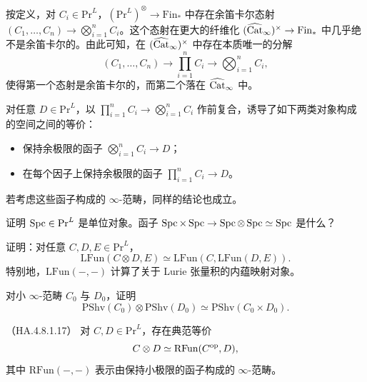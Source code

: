 \nitem\label{L25-3.2} 按定义，对 $C_{i}\in\mathrm{Pr}^{L}$，$(\mathrm{Pr}^{L})^{\otimes}\to\mathrm{Fin}_{*}$ 中存在余笛卡尔态射 $(C_{1},\dots,C_{n})\to\bigotimes_{i=1}^{n}C_{i}$。这个态射在更大的纤维化 $(\widehat{\operatorname{Cat}}_{\infty})^{\times}\to\mathrm{Fin}_{*}$ 中几乎绝不是余笛卡尔的。由此可知，在 $(\widehat{\operatorname{Cat}}_{\infty})^{\times}$ 中存在本质唯一的分解
\[
(C_{1},\dots,C_{n})\to\prod_{i=1}^{n}C_{i}\to\bigotimes_{i=1}^{n}C_{i},
\]
使得第一个态射是余笛卡尔的，而第二个落在 $\widehat{\operatorname{Cat}}_{\infty}$ 中。

\begin{exercise}\label{L25-3.3}
对任意 $D\in\mathrm{Pr}^{L}$，以 $\prod_{i=1}^{n}C_{i}\to\bigotimes_{i=1}^{n}C_{i}$ 作前复合，诱导了如下两类对象构成的空间之间的等价：
\begin{itemize}[leftmargin=2.2em,itemsep=0.1em]
\item 保持余极限的函子 $\bigotimes_{i=1}^{n}C_{i}\to D$；
\item 在每个因子上保持余极限的函子 $\prod_{i=1}^{n}C_{i}\to D$。
\end{itemize}
若考虑这些函子构成的 $\infty$-范畴，同样的结论也成立。
\end{exercise}

\begin{exercise}\label{L25-3.4}
证明 $\operatorname{Spc}\in\mathrm{Pr}^{L}$ 是单位对象。函子 $\operatorname{Spc}\times\operatorname{Spc}\to\operatorname{Spc}\otimes\operatorname{Spc}\simeq\operatorname{Spc}$ 是什么？
\end{exercise}

\begin{exercise}\label{L25-3.5}
证明：对任意 $C,D,E\in\mathrm{Pr}^{L}$，
\[
\mathrm{LFun}(C\otimes D,E)\simeq\mathrm{LFun}(C,\mathrm{LFun}(D,E)).
\]
特别地，$\mathrm{LFun}(-,-)$ 计算了关于 Lurie 张量积的内蕴映射对象。
\end{exercise}

\begin{exercise}\label{L25-3.6}
对小 $\infty$-范畴 $C_{0}$ 与 $D_{0}$，证明
\[
\mathrm{PShv}(C_{0})\otimes\mathrm{PShv}(D_{0})\simeq\mathrm{PShv}(C_{0}\times D_{0}).
\]
\end{exercise}

\begin{theorem}\label{L25-3.7}（HA.4.8.1.17）
对 $C,D\in\mathrm{Pr}^{L}$，存在典范等价
\[
C\otimes D\simeq\mathrm{RFun}(C^{\mathrm{op}},D),
\]
其中 $\mathrm{RFun}(-,-)$ 表示由保持小极限的函子构成的 $\infty$-范畴。
\end{theorem}

